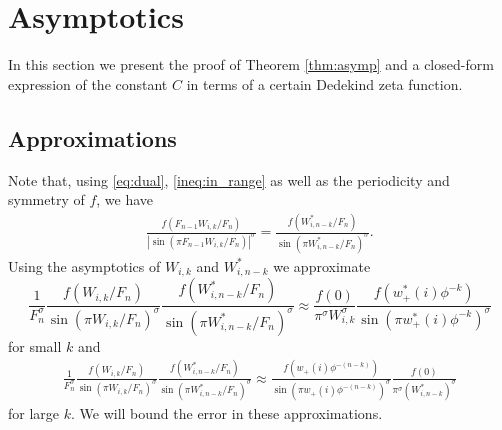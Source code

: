 \documentclass[]{interact}
\theoremstyle{definition}
\numberwithin{table}{section} %
\numberwithin{figure}{section}
\begin{document}
\section{Asymptotics} \label{sec:asymp}

In this section we present the proof of Theorem \ref{thm:asymp} and a closed-form expression of the constant $C$ in terms of a certain Dedekind zeta function.

\subsection{Approximations}

Note that, using \eqref{eq:dual}, \eqref{ineq:in_range} as well as the periodicity and symmetry of $f$, we have
\begin{align} \label{eq:introduce_dual}
    \frac{f(F_{n-1} W_{i, k}/F_n)}{\left|{\sin(\pi F_{n-1} W_{i, k}/F_n)}\right|^\sigma} = \frac{f(W^*_{i, n-k}/F_n)}{{\sin(\pi W^*_{i, n-k}/F_n)}^\sigma}.
\end{align}
Using the asymptotics of $W_{i, k}$ and $W_{i, n-k}^*$ we approximate
$$
\frac1{F_n^\sigma} \frac{f(W_{i, k}/F_n)}{{\sin(\pi W_{i, k}/F_n)}^\sigma} \frac{f(W^*_{i, n-k}/F_n)}{{\sin(\pi W^*_{i, n-k}/F_n)}^\sigma} \approx \frac{f(0) }{\pi^\sigma W_{i, k}^\sigma} \frac{f(w_+^*(i) \phi^{-k})}{{\sin(\pi w_+^*(i) \phi^{-k})}^\sigma}
$$
for small $k$ and
\begin{align*}
    \frac1{F_n^\sigma} \frac{f(W_{i, k}/F_n)}{{\sin(\pi W_{i, k}/F_n)}^\sigma} \frac{f(W^*_{i, n-k}/F_n)}{{\sin(\pi W^*_{i, n-k}/F_n)}^\sigma}
    \approx \frac{f(w_+(i) \phi^{-(n-k)})}{{\sin(\pi w_+(i) \phi^{-(n-k)})}^\sigma} \frac{f(0)}{ \pi^\sigma (W_{i, n-k}^*)^\sigma}
\end{align*}
for large $k$. We will bound the error in these approximations.
\end{document}
